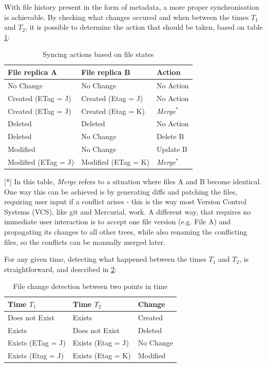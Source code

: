     With file history present in the form of metadata, a more proper synchronisation is achievable. By checking what changes occured and when between the times $T_1$ and $T_2$, it is possible to determine the action that should be taken, based on table \ref{table:simple-sync-actions}:\\

    \begin{table}[H]
      \centering
      \begin{tabular}{|l|l|l|}
        \hline \textbf{File replica A} & \textbf{File replica B} & \textbf{Action} \\ \hline \hline
         No Change & No Change & No Action \\ \hline
         Created (ETag = J) & Created (Etag = J) & No Action \\ \hline
         Created (ETag = J) & Created (Etag = K) & \emph{Merge$^*$} \\ \hline
         Deleted & Deleted & No Action \\ \hline
         Deleted & No Change & Delete B \\ \hline
         Modified & No Change & Update B \\ \hline
         Modified (ETag = J) & Modified (ETag = K) & \emph{Merge$^*$} \\ \hline
      \end{tabular}
      \caption{Syncing actions based on file states}
      \label{table:simple-sync-actions}
    \end{table}

    [*] In this table, \emph{Merge} refers to a situation where files A and B become identical. One way this can be achieved is by generating diffs and patching the files, requiring user input if a conflict arises - this is the way most Version Control Systems (VCS), like git and Mercurial, work. A different way, that requires no immediate user interaction is to accept one file version (e.g. File A) and propagating its changes to all other trees, while also renaming the conflicting files, so the conflicts can be manually merged later.

    For any given time, detecting what happened between the times $T_1$ and $T_2$, is straightforward, and described in \ref{table:time-change-detection}:\\

    \begin{table}[H]
      \centering
      \begin{tabular}{|l|l|l|}
        \hline \textbf{Time $T_1$} & \textbf{Time $T_2$} & \textbf{Change}\\ \hline \hline
         Does not Exist & Exists & Created \\ \hline
         Exists & Does not Exist & Deleted \\ \hline
         Exists (ETag = J) & Exists (Etag = J) & No Change \\ \hline
         Exists (Etag = J) & Exists (Etag = K) & Modified \\ \hline
      \end{tabular}
    \caption{File change detection between two points in time}
    \label{table:time-change-detection}
    \end{table}

